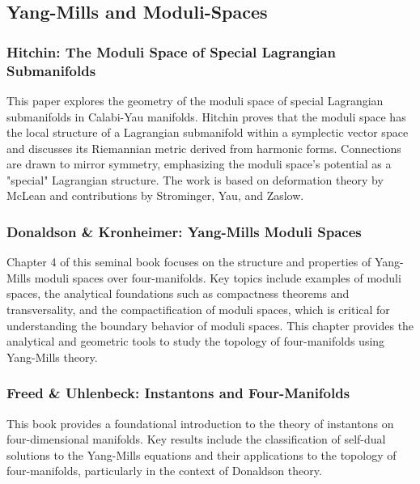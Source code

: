 \documentclass[10pt, letterpaper]{article}
\begin{document}
\vspace{1cm}








\subsection{Yang-Mills and Moduli-Spaces}

\subsubsection{Hitchin: The Moduli Space of Special Lagrangian Submanifolds \cite{hitchin1997moduli}} 
This paper explores the geometry of the moduli space of special Lagrangian submanifolds in Calabi-Yau manifolds. Hitchin proves that the moduli space has the local structure of a Lagrangian submanifold within a symplectic vector space and discusses its Riemannian metric derived from harmonic forms. Connections are drawn to mirror symmetry, emphasizing the moduli space's potential as a "special" Lagrangian structure. The work is based on deformation theory by McLean and contributions by Strominger, Yau, and Zaslow.




\subsubsection{Donaldson \& Kronheimer: Yang-Mills Moduli Spaces \cite{donaldson1990geometry}} 
Chapter 4 of this seminal book focuses on the structure and properties of Yang-Mills moduli spaces over four-manifolds. Key topics include examples of moduli spaces, the analytical foundations such as compactness theorems and transversality, and the compactification of moduli spaces, which is critical for understanding the boundary behavior of moduli spaces. This chapter provides the analytical and geometric tools to study the topology of four-manifolds using Yang-Mills theory.

\subsubsection{Freed \& Uhlenbeck: Instantons and Four-Manifolds \cite{freed1984instantons}} 
This book provides a foundational introduction to the theory of instantons on four-dimensional manifolds. Key results include the classification of self-dual solutions to the Yang-Mills equations and their applications to the topology of four-manifolds, particularly in the context of Donaldson theory.
\end{document}
